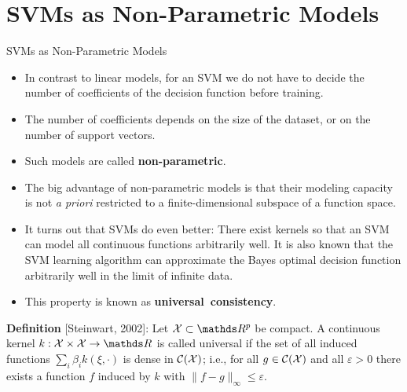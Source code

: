 \documentclass[11pt,compress,t,notes=noshow, xcolor=table]{beamer}
\begin{document}

\section{SVMs as Non-Parametric Models}

\begin{vbframe}{SVMs as Non-Parametric Models}

  \begin{itemize}
    \item In contrast to linear models, for an SVM
    we do not have to decide the number of coefficients of the
    decision function before training.
    \item The number of coefficients depends on the
    size of the dataset, or on the number of support vectors.
    \item Such models are called \textbf{non-parametric}.
    \item The big advantage of non-parametric models is that their
    modeling capacity is not \textit{a priori} restricted
    to a finite-dimensional subspace of a function space.
    \item It turns out that SVMs do even better: There exist kernels so
    that an SVM can model all continuous functions arbitrarily well.
    It is also known that the SVM learning algorithm can approximate the Bayes optimal decision
    function arbitrarily well in the limit of infinite data.
    \item This property is known as \textbf{universal~consistency}.
  \end{itemize}

  \framebreak

  \textbf{Definition} [Steinwart, 2002]:
  Let $\Xspace \subset \R^p$ be compact. A continuous kernel
  $k : \Xspace \times \Xspace \to \R$ is called universal if the set of all
  induced functions $\sum_i \beta_i k\left(\xi, \cdot\right)$ is dense in
  $\mathcal{C}(\mathcal{X})$; i.e., for all $g \in \mathcal{C}(\mathcal{X})$ and all
  $\varepsilon > 0$ there exists a function $f$ induced by $k$ with
  $\|f-g\|_\infty \leq \varepsilon$.\\[1em]


\end{vbframe}
\end{document}
